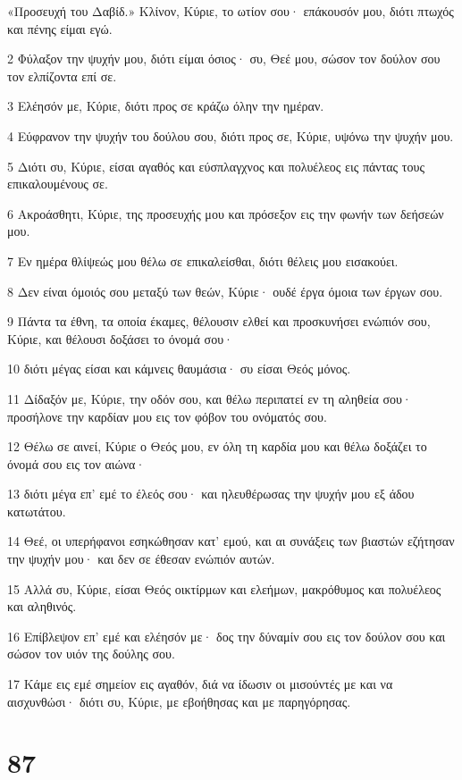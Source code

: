 \par «Προσευχή του Δαβίδ.» Κλίνον, Κύριε, το ωτίον σου· επάκουσόν μου, διότι πτωχός και πένης είμαι εγώ.
\par 2 Φύλαξον την ψυχήν μου, διότι είμαι όσιος· συ, Θεέ μου, σώσον τον δούλον σου τον ελπίζοντα επί σε.
\par 3 Ελέησόν με, Κύριε, διότι προς σε κράζω όλην την ημέραν.
\par 4 Εύφρανον την ψυχήν του δούλου σου, διότι προς σε, Κύριε, υψόνω την ψυχήν μου.
\par 5 Διότι συ, Κύριε, είσαι αγαθός και εύσπλαγχνος και πολυέλεος εις πάντας τους επικαλουμένους σε.
\par 6 Ακροάσθητι, Κύριε, της προσευχής μου και πρόσεξον εις την φωνήν των δεήσεών μου.
\par 7 Εν ημέρα θλίψεώς μου θέλω σε επικαλείσθαι, διότι θέλεις μου εισακούει.
\par 8 Δεν είναι όμοιός σου μεταξύ των θεών, Κύριε· ουδέ έργα όμοια των έργων σου.
\par 9 Πάντα τα έθνη, τα οποία έκαμες, θέλουσιν ελθεί και προσκυνήσει ενώπιόν σου, Κύριε, και θέλουσι δοξάσει το όνομά σου·
\par 10 διότι μέγας είσαι και κάμνεις θαυμάσια· συ είσαι Θεός μόνος.
\par 11 Δίδαξόν με, Κύριε, την οδόν σου, και θέλω περιπατεί εν τη αληθεία σου· προσήλονε την καρδίαν μου εις τον φόβον του ονόματός σου.
\par 12 Θέλω σε αινεί, Κύριε ο Θεός μου, εν όλη τη καρδία μου και θέλω δοξάζει το όνομά σου εις τον αιώνα·
\par 13 διότι μέγα επ' εμέ το έλεός σου· και ηλευθέρωσας την ψυχήν μου εξ άδου κατωτάτου.
\par 14 Θεέ, οι υπερήφανοι εσηκώθησαν κατ' εμού, και αι συνάξεις των βιαστών εζήτησαν την ψυχήν μου· και δεν σε έθεσαν ενώπιόν αυτών.
\par 15 Αλλά συ, Κύριε, είσαι Θεός οικτίρμων και ελεήμων, μακρόθυμος και πολυέλεος και αληθινός.
\par 16 Επίβλεψον επ' εμέ και ελέησόν με· δος την δύναμίν σου εις τον δούλον σου και σώσον τον υιόν της δούλης σου.
\par 17 Κάμε εις εμέ σημείον εις αγαθόν, διά να ίδωσιν οι μισούντές με και να αισχυνθώσι· διότι συ, Κύριε, με εβοήθησας και με παρηγόρησας.

\chapter{87}

